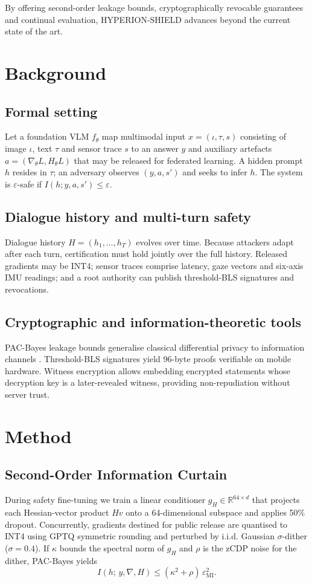 \documentclass{article}
\begin{document}
By offering second-order leakage bounds, cryptographically revocable guarantees and continual evaluation, HYPERION-SHIELD advances beyond the current state of the art.

\section{Background}
\subsection{Formal setting}
Let a foundation VLM $f_{\theta}$ map multimodal input $x = (\iota,\tau,s)$ consisting of image $\iota$, text $\tau$ and sensor trace $s$ to an answer $y$ and auxiliary artefacts $a = (\nabla_{\theta} L, H_{\theta} L)$ that may be released for federated learning. A hidden prompt $h$ resides in $\tau$; an adversary observes $(y,a,s')$ and seeks to infer $h$. The system is $\varepsilon$-safe if $I(h; y,a,s') \leq \varepsilon$.

\subsection{Dialogue history and multi-turn safety}
Dialogue history $H = (h_{1},\dots,h_{T})$ evolves over time. Because attackers adapt after each turn, certification must hold jointly over the full history. Released gradients may be INT4; sensor traces comprise latency, gaze vectors and six-axis IMU readings; and a root authority can publish threshold-BLS signatures and revocations.

\subsection{Cryptographic and information-theoretic tools}
PAC-Bayes leakage bounds generalise classical differential privacy to information channels \cite{wang-2024-mmcert}. Threshold-BLS signatures yield 96-byte proofs verifiable on mobile hardware. Witness encryption allows embedding encrypted statements whose decryption key is a later-revealed witness, providing non-repudiation without server trust.

\section{Method}
\subsection{Second-Order Information Curtain}
During safety fine-tuning we train a linear conditioner $g_{H}\in\mathbb{R}^{64\times d}$ that projects each Hessian-vector product $H v$ onto a 64-dimensional subspace and applies 50\% dropout. Concurrently, gradients destined for public release are quantised to INT4 using GPTQ symmetric rounding and perturbed by i.i.d. Gaussian $\sigma$-dither ($\sigma = 0.4$). If $\kappa$ bounds the spectral norm of $g_{H}$ and $\rho$ is the zCDP noise for the dither, PAC-Bayes yields
\[ I(h;\, y,\nabla,H) \leq (\kappa^{2}+\rho)\,\varepsilon_{\mathrm{MI}}^{2}. \]
\end{document}
